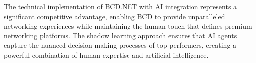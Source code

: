 The technical implementation of BCD.NET with AI integration represents a significant competitive advantage, enabling BCD to provide unparalleled networking experiences while maintaining the human touch that defines premium networking platforms. The shadow learning approach ensures that AI agents capture the nuanced decision-making processes of top performers, creating a powerful combination of human expertise and artificial intelligence. 

